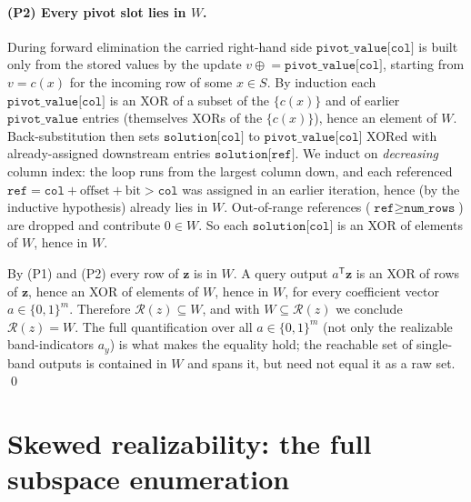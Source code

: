 \documentclass[acmsmall,review]{acmart}
\newcommand{\B}{\{0,1\}}
\newcommand{\W}{W}                          %
\newcommand{\Rz}{\mathcal{R}(z)}            %
\newcommand{\bz}{\mathbf{z}}                %
\newcommand{\ay}{a_y}                       %
\newcommand{\cx}{c(x)}                      %
\begin{document}
\paragraph{(P2) Every pivot slot lies in $\W$.}
During forward elimination the carried right-hand side $\texttt{pivot\_value[col]}$ is built only
from the stored values by the update $v \mathrel{\oplus}= \texttt{pivot\_value[col]}$, starting from
$v = \cx$ for the incoming row of some $x \in S$. By induction each $\texttt{pivot\_value[col]}$ is
an XOR of a subset of the $\{\cx\}$ and of earlier $\texttt{pivot\_value}$ entries (themselves XORs
of the $\{\cx\}$), hence an element of $\W$. Back-substitution then sets $\texttt{solution[col]}$ to
$\texttt{pivot\_value[col]}$ XORed with already-assigned downstream entries
$\texttt{solution[ref]}$. We induct on \emph{decreasing} column index: the loop runs from the
largest column down, and each referenced $\texttt{ref} = \texttt{col} + \mathrm{offset} + \mathrm{bit}
> \texttt{col}$ was assigned in an earlier iteration, hence (by the inductive hypothesis) already
lies in $\W$. Out-of-range references ($\texttt{ref} \ge \texttt{num\_rows}$) are dropped and
contribute $0 \in \W$. So each $\texttt{solution[col]}$ is an XOR of elements of $\W$, hence in $\W$.

By (P1) and (P2) every row of $\bz$ is in $\W$. A query output $a^{\mathsf T}\bz$ is an XOR of rows
of $\bz$, hence an XOR of elements of $\W$, hence in $\W$, for every coefficient vector
$a \in \B^m$. Therefore $\Rz \subseteq \W$, and with $\W \subseteq \Rz$ we conclude $\Rz = \W$. The
full quantification over all $a \in \B^m$ (not only the realizable band-indicators $\ay$) is what
makes the equality hold; the reachable set of single-band outputs is contained in $\W$ and spans it,
but need not equal it as a raw set. \qed

\section{Skewed realizability: the full subspace enumeration}
\label{app:skewed}
\end{document}
